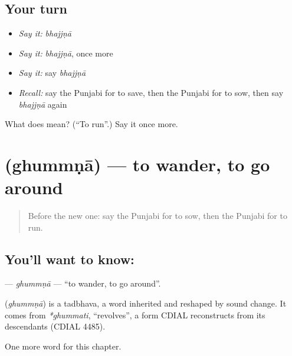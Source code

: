 \subsection*{Your turn}
\begin{itemize}
\raggedright
  \item \emph{Say it:} \emph{bhajjṇā}
  \item \emph{Say it:} \emph{bhajjṇā}, once more
  \item \emph{Say it:} say \emph{bhajjṇā}
  \item \emph{Recall:} say the Punjabi for to save, then the Punjabi for to sow, then say \emph{bhajjṇā} again
\end{itemize}

\begin{tcolorbox}[breakable,colback=teal!4,colframe=teal!35!black,title={Before you move on}]
What does  mean? (\textquotedblleft{}To run\textquotedblright{}.) Say it once more.
\end{tcolorbox}
\section[\texorpdfstring{\pa{ਘੁੰਮਣਾ} (ghummṇā)}{ਘੁੰਮਣਾ (ghummṇā)}]{ (ghummṇā) — to wander, to go around}

\label{lesson:PA-C152-ghummna}



\begin{quote}
Before the new one: say the Punjabi for to sow, then the Punjabi for to run.
\end{quote}

\subsection*{You'll want to know: }
\textbf{} — \emph{ghummṇā} — \textquotedblleft{}to wander, to go around\textquotedblright{}.

\begin{cousinweb}
\textbf{} (\emph{ghummṇā}) is a tadbhava, a word inherited and reshaped by sound change. It comes from \emph{*ghummati}, \textquotedblleft{}revolves\textquotedblright{}, a form CDIAL reconstructs from its descendants (CDIAL 4485).
\end{cousinweb}

\begin{grammarlens}[title={What you've built}]
One more word for this chapter.
\end{grammarlens}

